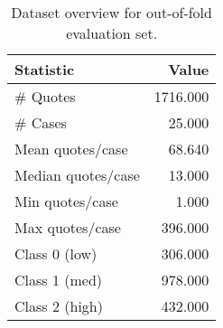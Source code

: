 \begin{table}
\caption{Dataset overview for out-of-fold evaluation set.}
\label{tab:dataset-summary}
\begin{tabular}{lr}
\toprule
Statistic & Value \\
\midrule
\# Quotes & 1716.000 \\
\# Cases & 25.000 \\
Mean quotes/case & 68.640 \\
Median quotes/case & 13.000 \\
Min quotes/case & 1.000 \\
Max quotes/case & 396.000 \\
Class 0 (low) & 306.000 \\
Class 1 (med) & 978.000 \\
Class 2 (high) & 432.000 \\
\bottomrule
\end{tabular}
\end{table}
